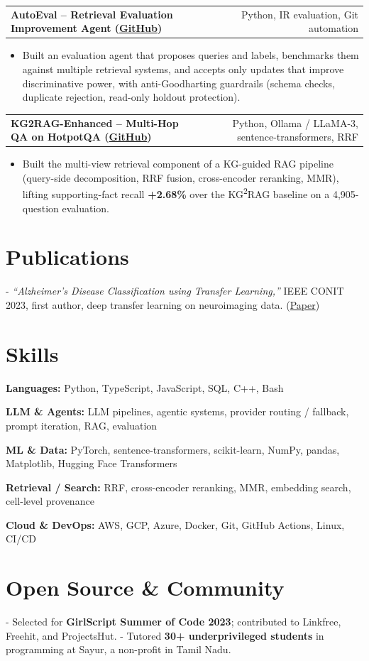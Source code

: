 \documentclass[letterpaper,11pt]{article}
\makeatletter
\newcommand{\projItem}[2]{%
  \vspace{2pt}
  \begin{tabular*}{\textwidth}{@{}l@{\extracolsep{\fill}}r@{}}
    \textbf{#1} & #2 \\
  \end{tabular*}\par\vspace{-3pt}
}
\newcommand{\skillLine}[2]{\textbf{#1:} #2\par\vspace{1.5pt}}
\newcommand{\inlineBlock}[1]{{\setlength{\leftskip}{0.18in}\small #1\par}}
\makeatother
\begin{document}
\projItem{AutoEval -- Retrieval Evaluation Improvement Agent {\normalfont\small(\href{https://github.com/Deva-1903/AutoEval}{GitHub})}}{Python, IR evaluation, Git automation}
\begin{itemize}
  \item Built an evaluation agent that proposes queries and labels, benchmarks them against multiple retrieval systems, and accepts only updates that improve discriminative power, with anti-Goodharting guardrails (schema checks, duplicate rejection, read-only holdout protection).
\end{itemize}

\projItem{KG2RAG-Enhanced -- Multi-Hop QA on HotpotQA {\normalfont\small(\href{https://github.com/Deva-1903/KG2RAG-685-NLP}{GitHub})}}{Python, Ollama / LLaMA-3, sentence-transformers, RRF}
\begin{itemize}
  \item Built the multi-view retrieval component of a KG-guided RAG pipeline (query-side decomposition, RRF fusion, cross-encoder reranking, MMR), lifting supporting-fact recall \textbf{+2.68\%} over the KG\textsuperscript{2}RAG baseline on a 4{,}905-question evaluation.
\end{itemize}

\section{Publications}
\vspace{2pt}
\inlineBlock{- \textit{``Alzheimer's Disease Classification using Transfer Learning,''} IEEE CONIT 2023, first author, deep transfer learning on neuroimaging data. {\normalfont\small(\href{https://ieeexplore.ieee.org/document/10205760}{Paper})}}

\section{Skills}
\skillLine{Languages}{Python, TypeScript, JavaScript, SQL, C++, Bash}
\skillLine{LLM \& Agents}{LLM pipelines, agentic systems, provider routing / fallback, prompt iteration, RAG, evaluation}
\skillLine{ML \& Data}{PyTorch, sentence-transformers, scikit-learn, NumPy, pandas, Matplotlib, Hugging Face Transformers}
\skillLine{Retrieval / Search}{RRF, cross-encoder reranking, MMR, embedding search, cell-level provenance}
\skillLine{Cloud \& DevOps}{AWS, GCP, Azure, Docker, Git, GitHub Actions, Linux, CI/CD}

\section{Open Source \& Community}
\inlineBlock{- Selected for \textbf{GirlScript Summer of Code 2023}; contributed to Linkfree, Freehit, and ProjectsHut. - Tutored \textbf{30+ underprivileged students} in programming at Sayur, a non-profit in Tamil Nadu.}
\end{document}
